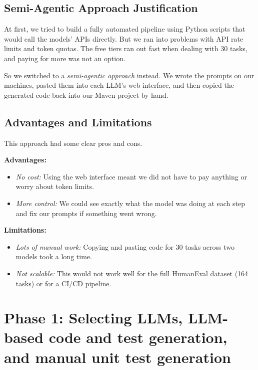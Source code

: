 \documentclass[12pt, a4paper]{article}
\begin{document}
\subsection{Semi-Agentic Approach Justification}
At first, we tried to build a fully automated pipeline using Python scripts that would call the models' APIs directly. But we ran into problems with API rate limits and token quotas. The free tiers ran out fast when dealing with 30 tasks, and paying for more was not an option.

So we switched to a \textit{semi-agentic approach} instead. We wrote the prompts on our machines, pasted them into each LLM's web interface, and then copied the generated code back into our Maven project by hand.

\subsection{Advantages and Limitations}
This approach had some clear pros and cons.

\textbf{Advantages:}
\begin{itemize}
    \item \textit{No cost:} Using the web interface meant we did not have to pay anything or worry about token limits.
    \item \textit{More control:} We could see exactly what the model was doing at each step and fix our prompts if something went wrong.
\end{itemize}

\textbf{Limitations:}
\begin{itemize}
    \item \textit{Lots of manual work:} Copying and pasting code for 30 tasks across two models took a long time.
    \item \textit{Not scalable:} This would not work well for the full HumanEval dataset (164 tasks) or for a CI/CD pipeline.
\end{itemize}

\section{Phase 1: Selecting LLMs, LLM-based code and test generation, and manual unit test generation }
\label{sec:phase1}
\end{document}
